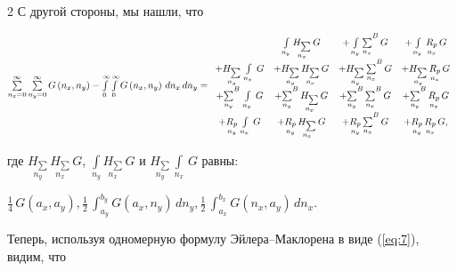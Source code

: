 \documentclass[twoside, 10pt]{article}
\begin{document}
\begin{multicols}{2}
    С другой стороны, мы нашли, что

\noindent
\(\sum\limits_{n_x=0}^{\infty} \sum\limits_{n_y=0}^{\infty} G\left(n_x, n_y\right) -\int\limits_{0}^{\infty} \int\limits_{0}^{\infty} G\left(n_x, n_y\right)\,d{n_x}\,d{n_y} = \\
 \begin{array}{cccc}  \, &  \int\limits_{n_y}^{} \underset{n_x}{H_{\sum}}\,G &  + \int\limits_{n_y}^{}{\sum\limits_{n_x}^{}}^{B}\,G &  + \int\limits_{n_y}^{}\,\underset{n_x}{R_{p}}\,G \\
  +\underset{n_y}{H_{\sum}}\,\int\limits_{n_x}^{}\,G &  + \underset{n_y}{H_{\sum}}\,\underset{n_x}{H_{\sum}}\,G &  + \underset{n_y}{H_{\sum}}\,{\sum\limits_{n_x}^{}}^{B}\,G &  + \underset{n_y}{H_{\sum}}\,\underset{n_x}{R_{p}}\,G \\
  + {\sum\limits_{n_y}^{}}^{B}\,\int\limits_{n_x}^{}\,G &  + {\sum\limits_{n_y}^{}}^{B}\,\underset{n_x}{H_{\sum}}\,G &  + {\sum\limits_{n_y}^{}}^{B}\,{\sum\limits_{n_x}^{}}^{B}\,G &  + {\sum\limits_{n_y}^{}}^{B}\,\underset{n_x}{R_{p}}\,G \\
  + \underset{n_y}{R_{p}}\,\int\limits_{n_x}^{}\,G &  + \underset{n_y}{R_{p}}\,\underset{n_x}{H_{\sum}}\,G &  + \underset{n_y}{R_{p}}\,{\sum\limits_{n_x}^{}}^{B}\,G &  + \underset{n_y}{R_{p}}\,\underset{n_x}{R_{p}}\,G, \end{array}\)

    где \(\underset{n_y}{H_{\sum}}\,\underset{n_x}{H_{\sum}}\,G\),
\(\int\limits_{n_y}^{} \underset{n_x}{H_{\sum}}\,G\)
и
\(\underset{n_y}{H_{\sum}}\,\int\limits_{n_x}^{}\,G\) равны:

\noindent
    \(\frac{1}{4} \, G\left(a_{x}, a_{y}\right) , \frac{1}{2} \, \int_{a_{y}}^{b_{y}} G\left(a_{x}, n_{y}\right)\,{d n_{y}} , \frac{1}{2} \, \int_{a_{x}}^{b_{x}} G\left(n_{x}, a_{y}\right)\,{d n_{x}}.\)

    Теперь, используя одномерную формулу Эйлера–Маклорена в виде (\ref{eq:7}), видим, что



\end{multicols}
\end{document}

